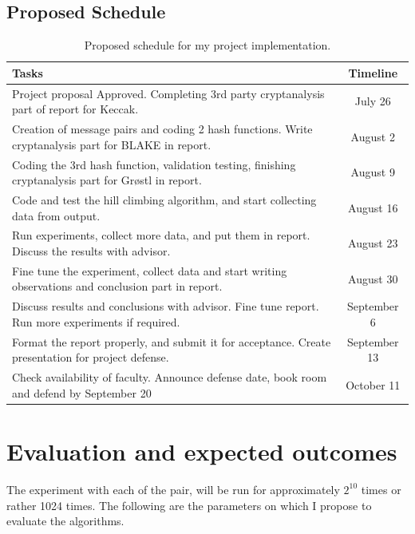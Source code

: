 \documentclass[12pt]{artikel3}                  %
\begin{document}
\subsection{Proposed Schedule}
\begin{table}[h]
  \begin{center}
    \begin{tabular}{ | p{12cm} | c | } \hline
      Tasks                                                                                                   & Timeline \\ \hline
      Project proposal Approved. Completing 3rd party cryptanalysis part of report for Keccak.                & July 26 \\ \hline
      Creation of message pairs and coding 2 hash functions. Write cryptanalysis part for BLAKE in report.    & August 2 \\ \hline
      Coding the 3rd hash function, validation testing, finishing cryptanalysis part for Gr{\o}stl in report. & August 9 \\ \hline
      Code and test the hill climbing algorithm, and start collecting data from output.                       & August 16 \\ \hline
      Run experiments, collect more data, and put them in report. Discuss the results with advisor.           & August 23 \\ \hline
      Fine tune the experiment, collect data and start writing observations and conclusion part in report.    & August 30 \\ \hline
      Discuss results and conclusions with advisor. Fine tune report. Run more experiments if required.       & September 6 \\ \hline
      Format the report properly, and submit it for acceptance. Create presentation for project defense.      & September 13 \\ \hline
      Check availability of faculty. Announce defense date, book room and defend by September 20              & October 11 \\ \hline
    \end{tabular}
  \caption{Proposed schedule for my project implementation.}
  \end{center}
\end{table}

\section{Evaluation and expected outcomes}
The experiment with each of the pair, will be run for approximately $2^{10}$ times or rather 1024 times.
The following are the parameters on which I propose to evaluate the algorithms. 
\end{document}
